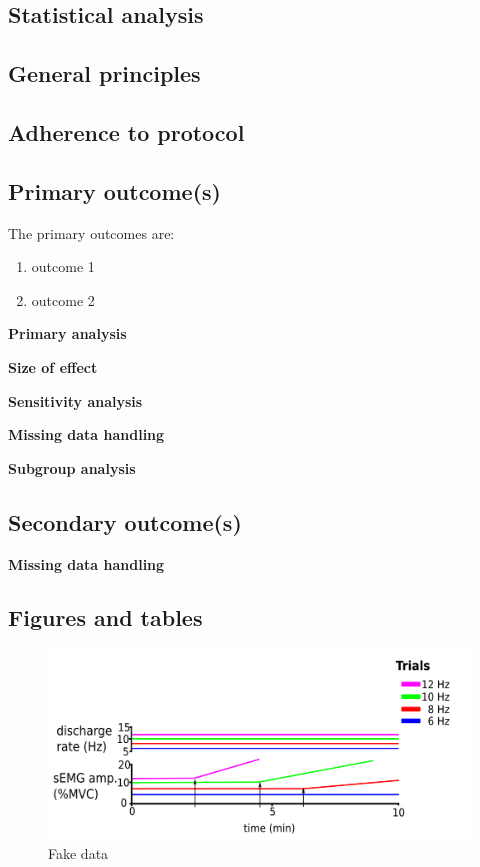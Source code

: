\documentclass[11pt,a4paper]{article}
\newcommand{\projectpath}{/home/joanna/Dropbox/Sketchbook/python/project_template}
\begin{document}
\subsection*{Statistical analysis}

\subsection*{General principles}

\subsection*{Adherence to protocol}

\subsection*{Primary outcome(s)} 
The primary outcomes are: 
\begin{enumerate}
	\item outcome 1
	\item outcome 2
\end{enumerate}

\textbf{Primary analysis}

\textbf{Size of effect}

\textbf{Sensitivity analysis}

\textbf{Missing data handling}

\textbf{Subgroup analysis}

\subsection*{Secondary outcome(s)} 

\textbf{Missing data handling}

\subsection*{Figures and tables}

\begin{figure}[!htbp]
\centering
\includegraphics[scale=0.75]{./img/fake_data.png}
\captionsetup{justification=centering}
\caption{Fake data}
\end{figure}

\newpage


 
\end{document}

